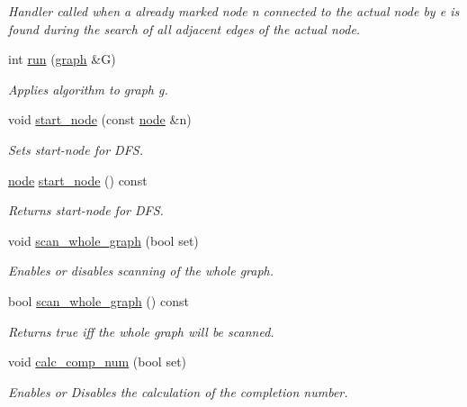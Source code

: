 \begin{DoxyCompactItemize}
\begin{DoxyCompactList}\small\item\em Handler called when a already marked node {\itshape n} connected to the actual node by {\itshape e} is found during the search of all adjacent edges of the actual node. \end{DoxyCompactList}\item 
int \mbox{\hyperlink{classdfs_af0863b8974d5fd58cd0375c78ed8163b}{run}} (\mbox{\hyperlink{classgraph}{graph}} \&G)
\begin{DoxyCompactList}\small\item\em Applies algorithm to graph g. \end{DoxyCompactList}\item 
void \mbox{\hyperlink{classdfs_aad21fd0d3036350fd341f877d5747852}{start\+\_\+node}} (const \mbox{\hyperlink{classnode}{node}} \&n)
\begin{DoxyCompactList}\small\item\em Sets start-\/node for D\+FS. \end{DoxyCompactList}\item 
\mbox{\hyperlink{classnode}{node}} \mbox{\hyperlink{classdfs_a7688d8eaf1308438820fec2ffe21257c}{start\+\_\+node}} () const
\begin{DoxyCompactList}\small\item\em Returns start-\/node for D\+FS. \end{DoxyCompactList}\item 
void \mbox{\hyperlink{classdfs_aa7c864a6f3a120720138b187b3ed95b5}{scan\+\_\+whole\+\_\+graph}} (bool set)
\begin{DoxyCompactList}\small\item\em Enables or disables scanning of the whole graph. \end{DoxyCompactList}\item 
bool \mbox{\hyperlink{classdfs_a025ed2d6101a7b9f72578a52b484ef50}{scan\+\_\+whole\+\_\+graph}} () const
\begin{DoxyCompactList}\small\item\em Returns true iff the whole graph will be scanned. \end{DoxyCompactList}\item 
void \mbox{\hyperlink{classdfs_a70862ea715c52eb95fb704afd3a6e676}{calc\+\_\+comp\+\_\+num}} (bool set)
\begin{DoxyCompactList}\small\item\em Enables or Disables the calculation of the completion number. \end{DoxyCompactList}\item 

\end{DoxyCompactItemize}
